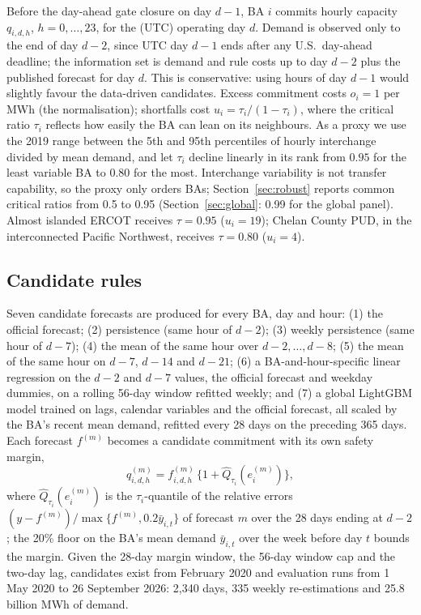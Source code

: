 Before the day-ahead gate closure on day $d-1$, BA $i$ commits hourly capacity $q_{i,d,h}$, $h=0,\dots,23$, for the (UTC) operating day $d$.
Demand is observed only to the end of day $d-2$, since UTC day $d-1$ ends after any U.S.\ day-ahead deadline; the information set is demand and rule costs up to day $d-2$ plus the published forecast for day $d$.
This is conservative: using hours of day $d-1$ would slightly favour the data-driven candidates.
Excess commitment costs $o_i=1$ per MWh (the normalisation); shortfalls cost $u_i=\tau_i/(1-\tau_i)$, where the critical ratio $\tau_i$ reflects how easily the BA can lean on its neighbours.
As a proxy we use the 2019 range between the 5th and 95th percentiles of hourly interchange divided by mean demand, and let $\tau_i$ decline linearly in its rank from $0.95$ for the least variable BA to $0.80$ for the most.
Interchange variability is not transfer capability, so the proxy only orders BAs; Section~\ref{sec:robust} reports common critical ratios from 0.5 to 0.95 (Section~\ref{sec:global}: 0.99 for the global panel).
Almost islanded ERCOT receives $\tau=0.95$ ($u_i=19$); Chelan County PUD, in the interconnected Pacific Northwest, receives $\tau=0.80$ ($u_i=4$).

\subsection{Candidate rules}

Seven candidate forecasts are produced for every BA, day and hour:
(1) the official forecast;
(2) persistence (same hour of $d-2$);
(3) weekly persistence (same hour of $d-7$);
(4) the mean of the same hour over $d-2,\dots,d-8$;
(5) the mean of the same hour on $d-7$, $d-14$ and $d-21$;
(6) a BA-and-hour-specific linear regression on the $d-2$ and $d-7$ values, the official forecast and weekday dummies, on a rolling 56-day window refitted weekly; and
(7) a global LightGBM model \citep{Ke2017} trained on lags, calendar variables and the official forecast, all scaled by the BA's recent mean demand, refitted every 28 days on the preceding 365 days.
Each forecast $f^{(m)}$ becomes a candidate commitment with its own safety margin,
\[
q^{(m)}_{i,d,h}=f^{(m)}_{i,d,h}\,\big\{1+\widehat Q_{\tau_i}(e^{(m)}_i)\big\},
\]
where $\widehat Q_{\tau_i}(e^{(m)}_i)$ is the $\tau_i$-quantile of the relative errors $(y-f^{(m)})/\max\{f^{(m)},0.2\bar y_{i,t}\}$ of forecast $m$ over the 28 days ending at $d-2$; the 20\% floor on the BA's mean demand $\bar y_{i,t}$ over the week before day $t$ bounds the margin.
Given the 28-day margin window, the 56-day window cap and the two-day lag, candidates exist from February 2020 and evaluation runs from 1 May 2020 to 26 September 2026: 2,340 days, 335 weekly re-estimations and 25.8 billion MWh of demand.

